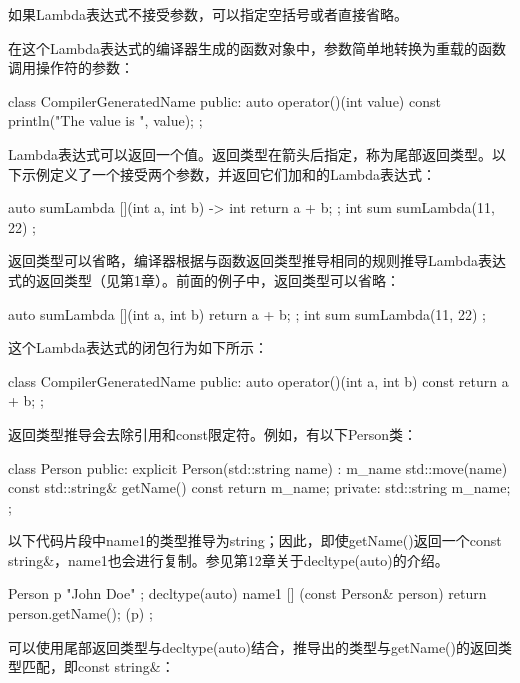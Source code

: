 如果Lambda表达式不接受参数，可以指定空括号或者直接省略。

在这个Lambda表达式的编译器生成的函数对象中，参数简单地转换为重载的函数调用操作符的参数：

\begin{cpp}
class CompilerGeneratedName
{
    public:
        auto operator()(int value) const { println("The value is {}", value); }
};
\end{cpp}

Lambda表达式可以返回一个值。返回类型在箭头后指定，称为尾部返回类型。以下示例定义了一个接受两个参数，并返回它们加和的Lambda表达式：

\begin{cpp}
auto sumLambda { [](int a, int b) -> int { return a + b; } };
int sum { sumLambda(11, 22) };
\end{cpp}

返回类型可以省略，编译器根据与函数返回类型推导相同的规则推导Lambda表达式的返回类型（见第1章）。前面的例子中，返回类型可以省略：

\begin{cpp}
auto sumLambda { [](int a, int b){ return a + b; } };
int sum { sumLambda(11, 22) };
\end{cpp}

这个Lambda表达式的闭包行为如下所示：

\begin{cpp}
class CompilerGeneratedName
{
    public:
        auto operator()(int a, int b) const { return a + b; }
};
\end{cpp}

返回类型推导会去除引用和const限定符。例如，有以下Person类：

\begin{cpp}
class Person
{
    public:
        explicit Person(std::string name) : m_name { std::move(name) } { }
        const std::string& getName() const { return m_name; }
    private:
        std::string m_name;
};
\end{cpp}

以下代码片段中name1的类型推导为string；因此，即使getName()返回一个const string\&，name1也会进行复制。参见第12章关于decltype(auto)的介绍。

\begin{cpp}
Person p { "John Doe" };
decltype(auto) name1 { [] (const Person& person) { return person.getName(); }(p) };
\end{cpp}

可以使用尾部返回类型与decltype(auto)结合，推导出的类型与getName()的返回类型匹配，即const string\&：


